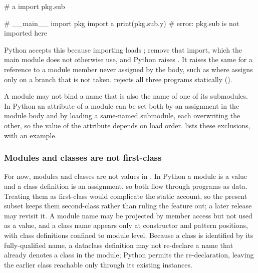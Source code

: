 \begin{minipage}[t]{0.25\textwidth}
\begin{python}
# a
import pkg.sub
\end{python}
\end{minipage}
\hfill
\begin{minipage}[t]{0.72\textwidth}
\begin{python}
# __main__
import pkg
import a
print(pkg.sub.y)  # error: pkg.sub is not imported here
\end{python}
\end{minipage}

\noindent Python accepts this because importing  loads ; remove that import,
which the main module does not otherwise use, and Python raises . It raises the
same for a reference to a module member never assigned by the body, such as  where
 assigns  only on a branch that is not taken. \PurePy rejects all three programs
statically ().

A module may not bind a name that is also the name of one of its submodules. In Python an attribute of a
module can be set both by an assignment in the module body and by loading a same-named submodule, each
overwriting the other, so the value of the attribute depends on load order.  lists these exclusions, with an example.

\subsubsection{Modules and classes are not first-class}
\label{sec:no-first-class}

For now, modules and classes are not values in \PurePy. In Python a module is a value and a class definition
is an assignment, so both flow through programs as data. Treating them as first-class would complicate the
static account, so the present subset keeps them second-class rather than ruling the feature out; a later
release may revisit it. A module name may be projected by member access but not used as a value, and a class
name appears only at constructor and pattern positions, with class definitions confined to module level. Because a
class is identified by its fully-qualified name, a dataclass definition may not re-declare a name that already
denotes a class in the module; Python permits the re-declaration, leaving the earlier class reachable only
through its existing instances.


